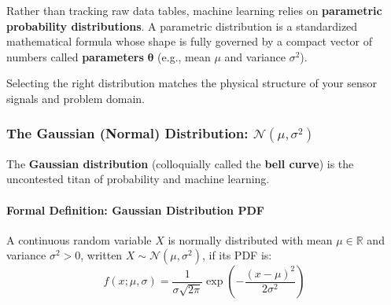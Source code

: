 Rather than tracking raw data tables, machine learning relies on \textbf{parametric probability distributions}. A parametric distribution is a standardized mathematical formula whose shape is fully governed by a compact vector of numbers called \textbf{parameters} $\mathbf{\theta}$ (e.g., mean $\mu$ and variance $\sigma^2$). 

Selecting the right distribution matches the physical structure of your sensor signals and problem domain.

\subsubsection{The Gaussian (Normal) Distribution: $\mathcal{N}(\mu, \sigma^2)$}
The \textbf{Gaussian distribution} (colloquially called the \textbf{bell curve}) is the uncontested titan of probability and machine learning.

\paragraph{Formal Definition: Gaussian Distribution PDF}

A continuous random variable $X$ is normally distributed with mean $\mu \in \mathbb{R}$ and variance $\sigma^2 > 0$, written $X \sim \mathcal{N}(\mu, \sigma^2)$, if its PDF is:
\begin{equation}
f(x; \mu, \sigma) = \frac{1}{\sigma \sqrt{2\pi}} \exp\left( -\frac{(x - \mu)^2}{2\sigma^2} \right)\label{eq:gaussian_pdf}
\end{equation}


